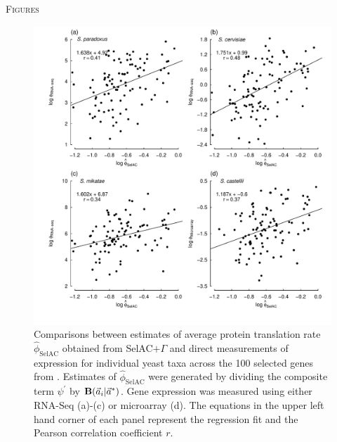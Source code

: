\documentclass[12pt,letterpaper,fleqn]{article}
\renewcommand{\section}[1]{%
\bigskip
\begin{center}
\begin{Large}
\normalfont\scshape #1
\medskip
\end{Large}
\end{center}}
\newcommand{\Funcaveci}{\ensuremath{\Func(\aveci|\aoptvec)}\xspace}
\newcommand{\Func}{\ensuremath{\text{\textbf{B}}}\xspace}
\newcommand{\selac}{SelAC\xspace}
\newcommand{\selacplusgamma}{SelAC$+\Gamma$\xspace}
\newcommand{\aoptvec}{\ensuremath{\Vec{a}^*}\xspace}
\newcommand{\aveci}{\ensuremath{\Vec{a}_i}\xspace}
\newcommand{\phihat}{\ensuremath{\hat{\phi}_{\text{\selac}}}\xspace}
\newcommand{\psiprime}{\ensuremath{\psi^\prime}\xspace}
\begin{document}
\clearpage %

\section{Figures}

\begin{figure}[H]
  \centering
  \includegraphics[width=0.9\linewidth]{FIGURE_1_SelACwG_vs_Empirical_by_spp.pdf}
  \caption{Comparisons between estimates of average protein translation rate $\phihat$ obtained from \selacplusgamma and direct measurements of expression for individual yeast taxa across the 100 selected genes from \citet{SalichosAndRokas2013}.
        Estimates of $\phihat$ were generated by dividing the composite term $\psiprime$ by \Funcaveci.
        Gene expression was measured using either RNA-Seq (a)-(c) or microarray (d). The equations in the upper left hand corner of each panel represent the regression fit and the Pearson correlation coefficient $r$.
  }
  \label{fig:PhivsEmpirical}
\end{figure}
\end{document}
